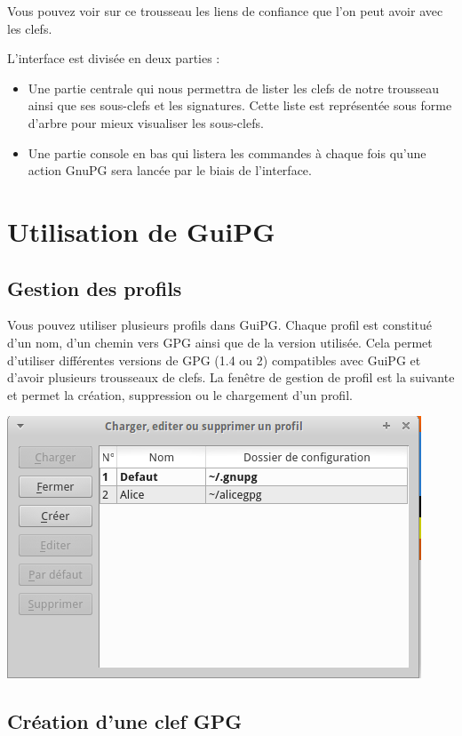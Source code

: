 \documentclass[a4paper,11pt,french]{article}
\begin{document}
Vous pouvez voir sur ce trousseau les liens de confiance que l'on peut avoir avec les clefs.

\smallbreak

L'interface est divisée en deux parties :
\begin{itemize}
\item Une partie centrale qui nous permettra de lister les clefs de notre trousseau ainsi que ses sous-clefs et les signatures. Cette liste est représentée sous forme d'arbre pour mieux visualiser les sous-clefs.
\item Une partie console en bas qui listera les commandes à chaque fois qu'une action GnuPG sera lancée par le biais de l'interface.
\end{itemize}

\section{Utilisation de GuiPG}

\subsection{Gestion des profils}

Vous pouvez utiliser plusieurs profils dans GuiPG. Chaque profil est constitué d'un nom, d'un chemin vers GPG ainsi que de la version utilisée. Cela permet d'utiliser différentes versions de GPG (1.4 ou 2) compatibles avec GuiPG et d'avoir plusieurs trousseaux de clefs. La fenêtre de gestion de profil est la suivante et permet la création, suppression ou le chargement d'un profil. \bigbreak

\includegraphics[scale=0.5]{profil.png}


\subsection{Création d'une clef GPG}
\end{document}
